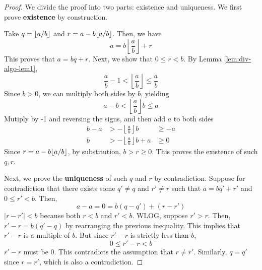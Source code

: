 \begin{proof}
    We divide the proof into two parts: existence and uniqueness. We first prove \textbf{existence} by construction.

    Take $q = \lfloor a/b\rfloor$ and $r = a - b \lfloor a/b\rfloor$. Then, we have
    $$
    a = b \left\lfloor \frac{a}{b} \right\rfloor + r
    $$
    This proves that $a = bq + r$. Next, we show that $0 \leq r < b$. By Lemma \ref{lem:div-algo-lem1}, 
    $$
    \frac{a}{b} - 1 < \left\lfloor \frac{a}{b} \right\rfloor \leq \frac{a}{b}
    $$
    Since $b > 0$, we can multiply both sides by $b$, yielding
    $$
    a - b < \left\lfloor \frac{a}{b} \right\rfloor b \leq a
    $$
    Mutiply by -1 and reversing the signs, and then add $a$ to both sides
    $$
    \begin{aligned}
        b - a &> - \left\lfloor \frac{a}{b} \right\rfloor b &\geq -a \\
        b &> - \left\lfloor \frac{a}{b} \right\rfloor b + a &\geq 0
    \end{aligned}
    $$
    Since $r = a - b \lfloor a/b\rfloor$, by substitution, $b > r \geq 0$. This proves the existence of such $q,r$.

    Next, we prove the \textbf{uniqueness} of such $q$ and $r$ by contradiction. Suppose for contradiction that there exists some $q' \neq q$ and $r' \neq r$ such that $a = bq' + r'$ and $0 \leq r' < b$. Then,
    $$
    a - a = 0 = b(q - q') + (r - r')
    $$
    $|r - r'| < b$ because both $r < b$ and $r' < b$. WLOG, suppose $r' > r$. Then, $r' - r = b(q' - q)$ by rearranging the previous inequality. This implies that $r' - r$ is a multiple of $b$. But since $r' - r$ is strictly less than $b$,
    $$
    0 \leq r' - r < b
    $$
    $r'-r$ must be 0. This contradicts the assumption that $r \neq r'$. Similarly, $q = q'$ since $r = r'$, which is also a contradiction.
\end{proof}

